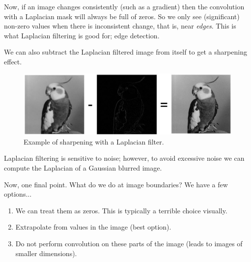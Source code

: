 Now, if an image changes consistently (such as a gradient) then the convolution with a Laplacian mask will always be full of zeros. So we only see (significant) non-zero values when there is inconsistent change, that is, near \emph{edges}. This is what Laplacian filtering is good for; edge detection.

We can also subtract the Laplacian filtered image from itself to get a sharpening effect.

\begin{figure}
    \centering
    \includegraphics[width=0.8\linewidth]{images/sharpening-laplacian}
    \caption{Example of sharpening with a Laplacian filter.}
    \label{fig:sharpening-laplacian}
\end{figure}

\begin{remark}
    Laplacian filtering is sensitive to noise; however, to avoid excessive noise we can compute the Laplacian of a Gaussian blurred image.
\end{remark}

Now, one final point. What do we do at image boundaries? We have a few options...
\begin{enumerate}
    \item We can treat them as zeros. This is typically a terrible choice visually.
    \item Extrapolate from values in the image (best option).
    \item Do not perform convolution on these parts of the image (leads to images of smaller dimensions).
\end{enumerate}
